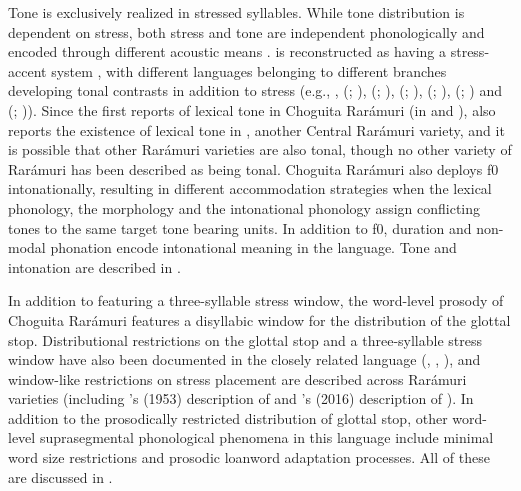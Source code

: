 Tone is exclusively realized in stressed syllables. While tone distribution is dependent on stress, both stress and tone are independent phonologically and encoded through different acoustic means \parencite{caballero2015tone}.  is reconstructed as having a stress-accent system \parencite{munro1977towards}, with different languages belonging to different branches developing tonal contrasts in addition to stress (e.g.,  \parencite{manaster1986genesis},  (; \citealt{woo1970tone}),  (; \citealt{guion2010word}),  (; \citealt{McMahon-1967}),  (; \citealt{grimes1959huichol}),  (; \citealt{demers1999prominence}) and  (; \citealt{hagberg1989floating})). Since the first reports of lexical tone in Choguita Rarámuri (in \cite{caballero2008choguita} and \cite{caballero2015tone}), \citet{moralesmoreno2016rochecahi} also reports the existence of lexical tone in , another Central Rarámuri variety, and it is possible that other Rarámuri varieties are also tonal, though no other variety of Rarámuri has been described as being tonal. Choguita Rarámuri also deploys f0 intonationally, resulting in different accommodation strategies when the lexical phonology, the morphology and the intonational phonology assign conflicting tones to the same target tone bearing units. In addition to f0, duration and non-modal phonation encode intonational meaning in the language. Tone and intonation are described in .

In addition to featuring a three-syllable stress window, the word-level prosody of Choguita Rarámuri features a disyllabic window for the distribution of the  glottal stop. Distributional restrictions on the glottal stop and a three-syllable stress window have also been documented in the closely related  language  (\citealt{miller1996guarijio}, \citealt{haugen2014laryngeals}, \citealt{haugen2014laryngeals}), and window-like restrictions on stress placement are described across Rarámuri varieties (including \citeauthor{brambila1953gramatica}'s (1953) description of  and \citeauthor{moralesmoreno2016rochecahi}'s (2016) description of ). In addition to the prosodically restricted distribution of glottal stop, other word-level suprasegmental phonological phenomena in this language include minimal word size restrictions and prosodic loanword adaptation processes. All of these are discussed in .


